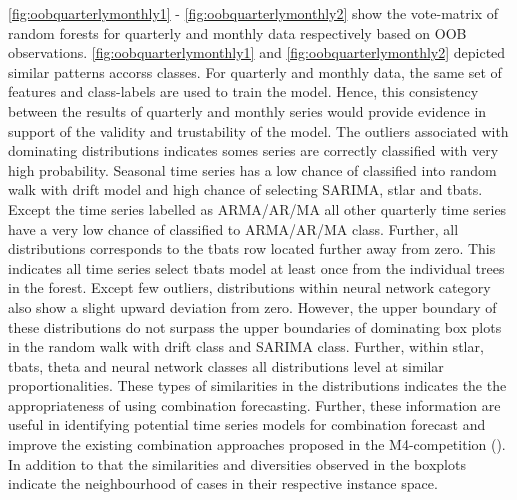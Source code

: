 \documentclass[11pt,a4paper,]{article}
\begin{document}
\autoref{fig:oobquarterlymonthly1} - \autoref{fig:oobquarterlymonthly2}
show the vote-matrix of random forests for quarterly and monthly data
respectively based on OOB observations.
\autoref{fig:oobquarterlymonthly1} and
\autoref{fig:oobquarterlymonthly2} depicted similar patterns accorss
classes. For quarterly and monthly data, the same set of features and
class-labels are used to train the model. Hence, this consistency
between the results of quarterly and monthly series would provide
evidence in support of the validity and trustability of the model. The
outliers associated with dominating distributions indicates somes series
are correctly classified with very high probability. Seasonal time
series has a low chance of classified into random walk with drift model
and high chance of selecting SARIMA, stlar and tbats. Except the time
series labelled as ARMA/AR/MA all other quarterly time series have a
very low chance of classified to ARMA/AR/MA class. Further, all
distributions corresponds to the tbats row located further away from
zero. This indicates all time series select tbats model at least once
from the individual trees in the forest. Except few outliers,
distributions within neural network category also show a slight upward
deviation from zero. However, the upper boundary of these distributions
do not surpass the upper boundaries of dominating box plots in the
random walk with drift class and SARIMA class. Further, within stlar,
tbats, theta and neural network classes all distributions level at
similar proportionalities. These types of similarities in the
distributions indicates the the appropriateness of using combination
forecasting. Further, these information are useful in identifying
potential time series models for combination forecast and improve the
existing combination approaches proposed in the M4-competition
(\textcite{Makridakis2018dx}). In addition to that the similarities and
diversities observed in the boxplots indicate the neighbourhood of cases
in their respective instance space.
\end{document}
